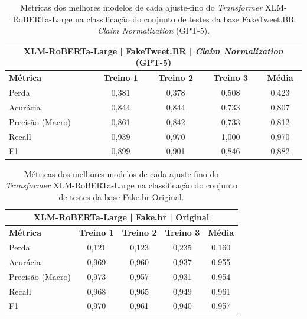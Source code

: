 \begin{table}[!htbp]
\centering
\begin{tabular}{l*4c}
\toprule
\multicolumn{5}{c}{\textbf{XLM-RoBERTa-Large | FakeTweet.BR | \textit{Claim Normalization} (GPT-5)}} \\ 
\midrule
\textbf{Métrica} & \textbf{Treino 1} & \textbf{Treino 2} & \textbf{Treino 3} & \textbf{Média} \\ 
\midrule
Perda & 0,381 & 0,378 & 0,508 & 0,423 \\ 
Acurácia & 0,844 & 0,844 & 0,733 & 0,807 \\ 
Precisão (Macro) & 0,861 & 0,842 & 0,733 & 0,812 \\ 
Recall & 0,939 & 0,970 & 1,000 & 0,970 \\ 
F1 & 0,899 & 0,901 & 0,846 & 0,882 \\ 
\bottomrule
\end{tabular}
\caption{Métricas dos melhores modelos de cada ajuste-fino do \textit{Transformer} XLM-RoBERTa-Large na classificação do conjunto de testes da base FakeTweet.BR \textit{Claim Normalization} (GPT-5).}
\end{table}

\begin{table}[!htbp]
\centering
\begin{tabular}{l*4c}
\toprule
\multicolumn{5}{c}{\textbf{XLM-RoBERTa-Large | Fake.br | Original}} \\ 
\midrule
\textbf{Métrica} & \textbf{Treino 1} & \textbf{Treino 2} & \textbf{Treino 3} & \textbf{Média} \\ 
\midrule
Perda & 0,121 & 0,123 & 0,235 & 0,160 \\ 
Acurácia & 0,969 & 0,960 & 0,937 & 0,955 \\ 
Precisão (Macro) & 0,973 & 0,957 & 0,931 & 0,954 \\ 
Recall & 0,968 & 0,965 & 0,949 & 0,961 \\ 
F1 & 0,970 & 0,961 & 0,940 & 0,957 \\ 
\bottomrule
\end{tabular}
\caption{Métricas dos melhores modelos de cada ajuste-fino do \textit{Transformer} XLM-RoBERTa-Large na classificação do conjunto de testes da base Fake.br Original.}
\end{table}

